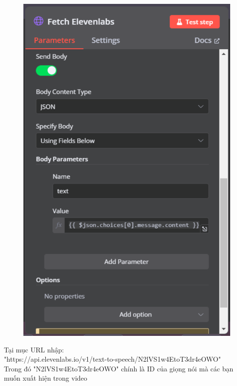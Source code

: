 \begin{itemize}[label=]
\begin{figure}[h]
    \begin{minipage}{0.45\textwidth}
         \includegraphics[width=\linewidth]{images/Elevenlabs-3.pdf}
    \end{minipage}
\end{figure}

Tại mục URL nhập: \\
"https://api.elevenlabs.io/v1/text-to-speech/N2lVS1w4EtoT3dr4eOWO"\\

Trong đó "N2lVS1w4EtoT3dr4eOWO" chính là ID của giọng nói mà các bạn muốn xuất hiện trong video


\end{itemize}
